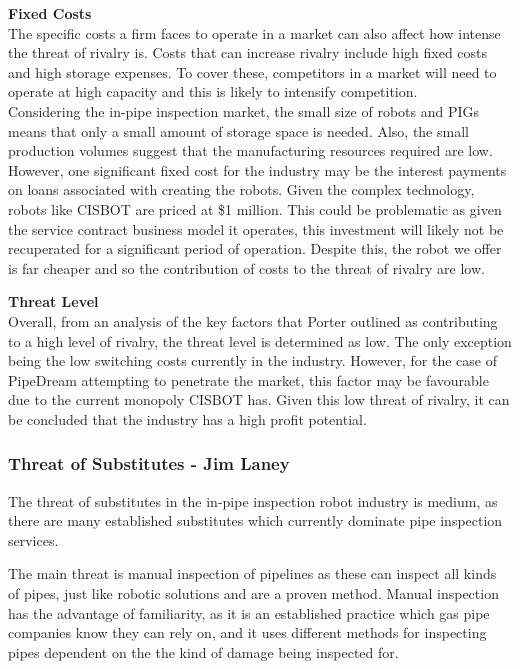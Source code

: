 \documentclass[11pt]{article}		%
\begin{document}
		        \textbf{Fixed Costs}\\
		        The specific costs a firm faces to operate in a market can also affect how intense the threat of rivalry is. Costs that can increase rivalry include high fixed costs and high storage expenses. To cover these, competitors in a market will need to operate at high capacity and this is likely to intensify competition.\\
		        \hspace*{3ex}Considering the in-pipe inspection market, the small size of robots and PIGs means that only a small amount of storage space is needed. Also, the small production volumes suggest that the manufacturing resources required are low. However, one significant fixed cost for the industry may be the interest payments on loans associated with creating the robots. Given the complex technology, robots like CISBOT are priced at \$1 million. This could be problematic as given the service contract business model it operates, this investment will likely not be recuperated for a significant period of operation. Despite this, the robot we offer is far cheaper and so the contribution of costs to the threat of rivalry are low. 
		        
		        \textbf{Threat Level}\\
		        Overall, from an analysis of the key factors that Porter outlined as contributing to a high level of rivalry, the threat level is determined as low. The only exception being the low switching costs currently in the industry. However, for the case of PipeDream attempting to penetrate the market, this factor may be favourable due to the current monopoly CISBOT has. Given this low threat of rivalry, it can be concluded that the industry has a high profit potential.
		        
	       \subsubsection{Threat of Substitutes - Jim Laney}
				
				The threat of substitutes in the in-pipe inspection robot industry is medium, as there are many established substitutes which currently dominate pipe inspection services.
				
				The main threat is manual inspection of pipelines as these can inspect all kinds of pipes, just like robotic solutions and are a proven method.
				Manual inspection has the advantage of familiarity, as it is an established practice which gas pipe companies know they can rely on, and it uses different methods for inspecting pipes dependent on the the kind of damage being inspected for.
				
\end{document}
